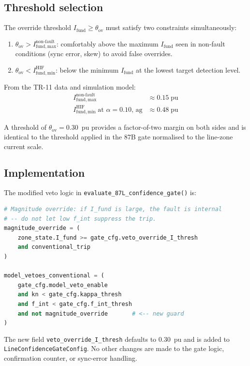\documentclass[11pt,a4paper]{article}
\newcommand{\Ifund}{I_{\mathrm{fund}}}
\begin{document}
\subsection{Threshold selection}

The override threshold $\Ifund \geq \theta_{\mathrm{ov}}$ must satisfy two
constraints simultaneously:
\begin{enumerate}
  \item $\theta_{\mathrm{ov}} > I_{\mathrm{fund,max}}^{\mathrm{non\text{-}fault}}$:
        comfortably above the maximum $\Ifund$ seen in non-fault conditions
        (sync error, skew) to avoid false overrides.
  \item $\theta_{\mathrm{ov}} < I_{\mathrm{fund,min}}^{\mathrm{HIF}}$: below the
        minimum $\Ifund$ at the lowest target detection level.
\end{enumerate}

From the TR-11 data and simulation model:
\begin{align}
  I_{\mathrm{fund,max}}^{\mathrm{non\text{-}fault}} &\approx 0.15\;\text{pu} \\
  I_{\mathrm{fund,min}}^{\mathrm{HIF}} \;\text{at } \alpha=0.10,\,\text{ag}
    &\approx 0.48\;\text{pu}
\end{align}

A threshold of $\theta_{\mathrm{ov}} = 0.30$~pu provides a factor-of-two
margin on both sides and is identical to the threshold applied in the 87B
gate normalised to the line-zone current scale.

\subsection{Implementation}

The modified veto logic in \texttt{evaluate\_87L\_confidence\_gate()} is:

\begin{lstlisting}[language=Python]
# Magnitude override: if I_fund is large, the fault is internal
# -- do not let low f_int suppress the trip.
magnitude_override = (
    zone_state.I_fund >= gate_cfg.veto_override_I_thresh
    and conventional_trip
)

model_vetoes_conventional = (
    gate_cfg.model_veto_enable
    and kn < gate_cfg.kappa_thresh
    and f_int < gate_cfg.f_int_thresh
    and not magnitude_override       # <-- new guard
)
\end{lstlisting}

The new field \texttt{veto\_override\_I\_thresh} defaults to 0.30~pu and is
added to \texttt{LineConfidenceGateConfig}.  No other changes are made to the
gate logic, confirmation counter, or sync-error handling.
\end{document}
